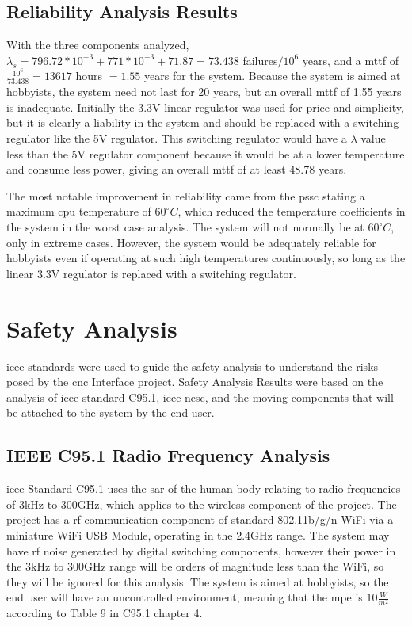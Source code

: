 \subsection{Reliability Analysis Results}
With the three components analyzed, $\lambda_s=796.72*10^{-3}+771*10^{-3}+71.87=73.438$ failures$/10^6$ years, and a \gls{mttf} of $\frac{10^6}{73.438}=13617$ hours $=1.55$ years for the system.
Because the system is aimed at hobbyists, the system need not last for 20 years, but an overall \gls{mttf} of 1.55 years is inadequate.
Initially the 3.3V linear regulator was used for price and simplicity, but it is clearly a liability in the system and should be replaced with a switching regulator like the 5V regulator.
This switching regulator would have a $\lambda$ value less than the 5V regulator component because it would be at a lower temperature and consume less power, giving an overall \gls{mttf} of at least 48.78 years.

The most notable improvement in reliability came from the \gls{pssc} stating a maximum \gls{cpu} temperature of $60^{\circ}C$, which reduced the temperature coefficients in the system in the worst case analysis.
The system will not normally be at $60^{\circ}C$, only in extreme cases.
However, the system would be adequately reliable for hobbyists even if operating at such high temperatures continuously, so long as the linear 3.3V regulator is replaced with a switching regulator.

\section{Safety Analysis}
\gls{ieee} standards were used to guide the safety analysis to understand the risks posed by the \gls{cnc} Interface project.
Safety Analysis Results were based on the analysis of \gls{ieee} standard C95.1\cite{ieeec951}, \gls{ieee} \gls{nesc}\cite{ieeenesc}, and the moving components that will be attached to the system by the end user. 

\subsection{IEEE C95.1 Radio Frequency Analysis}
\gls{ieee} Standard C95.1\cite{ieeec951} uses the \gls{sar} of the human body relating to radio frequencies of 3kHz to 300GHz, which applies to the wireless component of the project.
The project has a \gls{rf} communication component of standard 802.11b/g/n WiFi via a miniature WiFi USB Module, operating in the 2.4GHz range.
The system may have \gls{rf} noise generated by digital switching components, however their power in the 3kHz to 300GHz range will be orders of magnitude less than the WiFi, so they will be ignored for this analysis.
The system is aimed at hobbyists, so the end user will have an uncontrolled environment, meaning that the \gls{mpe} is $10\frac{W}{m^2}$ according to Table 9 in C95.1 chapter 4\cite{ieeec951}.

